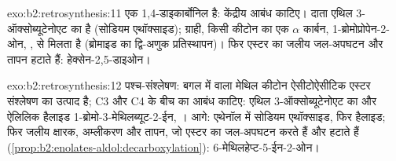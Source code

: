 \begin{solution}{exo:b2:retrosynthesis:11}
 एक 1,4-डाइकार्बोनिल है: केंद्रीय  आबंध काटिए। दाता
एथिल 3-ऑक्सोब्यूटेनोएट का  है (सोडियम एथॉक्साइड); ग्राही, किसी कीटोन का एक $\alpha$ कार्बन,
1-ब्रोमोप्रोपेन-2-ओन, , से मिलता है (ब्रोमाइड का द्वि-अणुक प्रतिस्थापन)। फिर एस्टर का जलीय जल-अपघटन
और तापन  हटाते हैं: हेक्सेन-2,5-डाइओन।
\end{solution}

\begin{solution}{exo:b2:retrosynthesis:12}
पश्च-संश्लेषण: बगल में  वाला मेथिल कीटोन ऐसीटोऐसीटिक एस्टर संश्लेषण का उत्पाद है;
C3 और C4 के बीच का आबंध काटिए: एथिल 3-ऑक्सोब्यूटेनोएट का  और ऐलिलिक हैलाइड
1-ब्रोमो-3-मेथिलब्यूट-2-ईन, । आगे: एथेनॉल में सोडियम एथॉक्साइड, फिर हैलाइड;
फिर जलीय क्षारक, अम्लीकरण और तापन, जो एस्टर का जल-अपघटन करते हैं और  हटाते हैं
(\cref{prop:b2:enolates-aldol:decarboxylation}): 6-मेथिलहेप्ट-5-ईन-2-ओन।
\end{solution}

